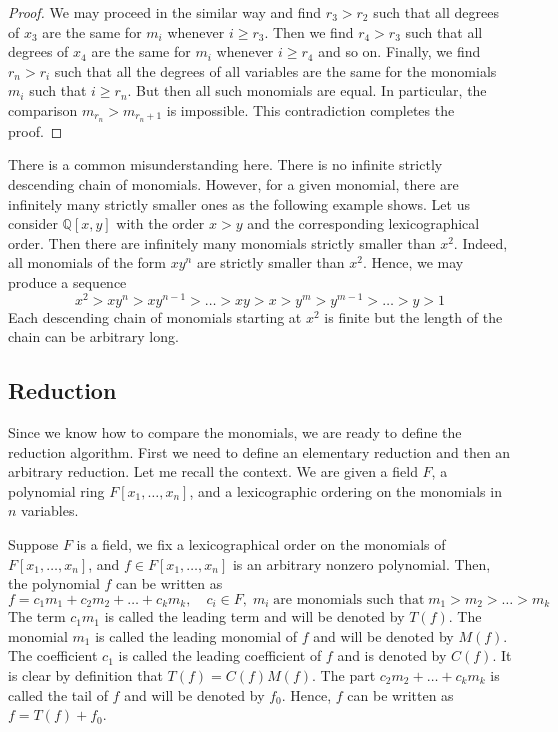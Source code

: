 \begin{proof}
We may proceed in the similar way and find $r_3 > r_2$ such that all degrees of $x_3$ are the same for $m_i$ whenever $i\geqslant r_3$.
Then we find $r_4 > r_3$ such that all degrees of $x_4$ are the same for $m_i$ whenever $i \geqslant r_4$ and so on.
Finally, we find $r_n > r_i$ such that all the degrees of all variables are the same for the monomials $m_i$ such that $i \geqslant r_n$.
But then all such monomials are equal.
In particular, the comparison $m_{r_n}>m_{r_n+1}$ is impossible.
This contradiction completes the proof.
\end{proof}


\begin{remark}
There is a common misunderstanding here.
There is no infinite strictly descending chain of monomials.
However, for a given monomial, there are infinitely many strictly smaller ones as the following example shows.
Let us consider $\mathbb Q[x, y]$ with the order $x > y$ and the corresponding lexicographical order.
Then there are infinitely many monomials strictly smaller than $x^2$.
Indeed, all monomials of the form $xy^n$ are strictly smaller than $x^2$.
Hence, we may produce a sequence
\[
x^2 > xy^n > xy^{n-1} > \ldots > xy > x > y^m > y^{m-1} > \ldots > y > 1
\]
Each descending chain of monomials starting at $x^2$ is finite but the length of the chain can be arbitrary long.
\end{remark}


\subsection{Reduction}

Since we know how to compare the monomials, we are ready to define the reduction algorithm.
First we need to define an elementary reduction and then an arbitrary reduction.
Let me recall the context.
We are given a field $F$, a polynomial ring $F[x_1,\ldots,x_n]$, and a lexicographic ordering on the monomials in $n$ variables.


\begin{definition}
Suppose $F$ is a field, we fix a lexicographical order on the monomials of $F[x_1,\ldots,x_n]$, and $f\in F[x_1,\ldots,x_n]$ is an arbitrary nonzero polynomial.
Then, the polynomial $f$ can be written as
\[
f = c_1 m_1 + c_2 m_2 + \ldots + c_k m_k,\quad c_i\in F,\;m_i\;\text{are monomials such that}\; m_1 > m_2 >\ldots>m_k
\]
The term $c_1m_1$ is called the leading term and will be denoted by $T(f)$.
The monomial $m_1$ is called the leading monomial of $f$ and will be denoted by $M(f)$.
The coefficient $c_1$ is called the leading coefficient of $f$ and is denoted by $C(f)$.
It is clear by definition that $T(f) = C(f) M(f)$.
The part $c_2m_2 + \ldots + c_k m_k$ is called the tail of $f$ and will be denoted by $f_0$.
Hence, $f$ can be written as $f = T(f) + f_0$.
\end{definition}



